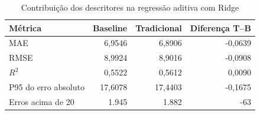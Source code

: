 \begin{table}[htbp]
\centering\small
\caption{Contribuição dos descritores na regressão aditiva com Ridge}\label{tab:incremento}
\begin{tabular}{lrrr}
\toprule
Métrica & Baseline & Tradicional & Diferença T--B\\\midrule
MAE & 6,9546 & 6,8906 & -0,0639\\
RMSE & 8,9924 & 8,9016 & -0,0908\\
$R^2$ & 0,5522 & 0,5612 & 0,0090\\
P95 do erro absoluto & 17,6078 & 17,4403 & -0,1675\\
Erros acima de 20 & 1.945 & 1.882 & -63\\
\bottomrule
\end{tabular}
\end{table}
